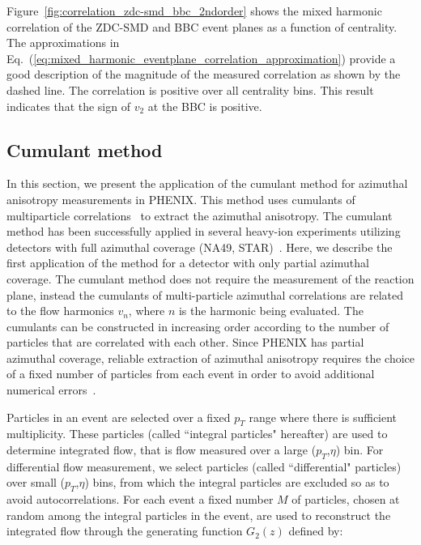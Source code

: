 \documentclass[aps,prc,superscriptaddress,showpacs,floatfix,twocolumn]{revtex4}
\newcommand \pt{\mbox{$p_T$}\xspace}
\begin{document}
Figure~\ref{fig:correlation_zdc-smd_bbc_2ndorder} shows the mixed harmonic correlation of the 
ZDC-SMD and BBC event planes as a function of centrality. The approximations in 
Eq.~(\ref{eq:mixed_harmonic_eventplane_correlation_approximation}) provide a good description of 
the magnitude of the measured correlation as shown by the dashed line.  The correlation is positive 
over all centrality bins. This result indicates that the sign of $v_2$ at the BBC is positive.


\subsection{Cumulant method \label{subsec:cumulantmethod}}

In this section, we present the application of the cumulant method for azimuthal 
anisotropy measurements in PHENIX.  This method uses cumulants of multiparticle 
correlations~\cite{Borghini:2001vi,Borghini:2001zr} to extract the azimuthal anisotropy.  
The cumulant method has been successfully 
applied in several heavy-ion experiments utilizing detectors with full azimuthal coverage 
(NA49, STAR)~\cite{Alt:2003ab,Adler:2002pu}. Here, we describe the first application of the method for a 
detector with only partial azimuthal coverage. The cumulant method does not require the measurement of the 
reaction plane, instead the cumulants of multi-particle azimuthal correlations are related to the flow 
harmonics $v_n$, where $n$ is the harmonic being evaluated. The cumulants can be constructed in increasing 
order according to the number of particles that are correlated with each other. Since PHENIX has partial 
azimuthal coverage, reliable extraction of azimuthal anisotropy requires the choice of a fixed number of 
particles from each event in order to avoid additional numerical errors~\cite{Borghini:2001vi}. 

Particles in an event are selected over a fixed \pt range where there is sufficient multiplicity.
These particles (called ``integral particles" hereafter) are 
used to determine integrated flow, that is
flow measured over a large (\pt,$\eta$) bin. For differential flow measurement, we select particles 
(called ``differential" particles) over small (\pt,$\eta$) bins, 
from which the integral particles are excluded 
so as to avoid autocorrelations. For each event a fixed number $M$ of particles, chosen at random among 
the integral particles in the event, are used to reconstruct the integrated flow through 
the generating function $G_2(z)$ defined by:
\end{document}
